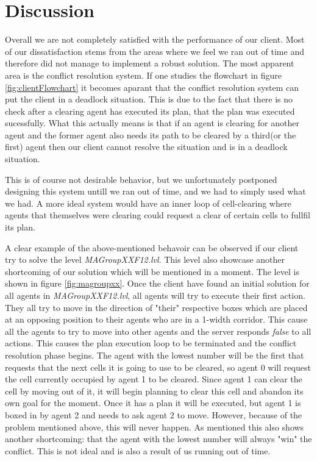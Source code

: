 \documentclass[letterpaper]{article}
\begin{document}
\section{Discussion}
Overall we are not completely satisfied with the performance of our client. Most of our dissatisfaction stems from the areas where we feel we ran out of time and therefore did not manage to implement a robust solution. The most apparent area is the conflict resolution system. If one studies the flowchart in figure \ref{fig:clientFlowchart} it becomes aparant that the conflict resolution system can put the client in a deadlock situation. This is due to the fact that there is no check after a clearing agent has executed its plan, that the plan was executed sucessfully. What this actually means is that if an agent is clearing for another agent and the former agent also needs its path to be cleared by a third(or the first) agent then our client cannot resolve the situation and is in a deadlock situation.

This is of course not desirable behavior, but we unfortunately postponed designing this system untill we ran out of time, and we had to simply used what we had. A more ideal system would have an inner loop of cell-clearing where agents that themselves were clearing could request a clear of certain cells to fullfil its plan.

A clear example of the above-mentioned behavoir can be observed if our client try to solve the level \textit{MAGroupXXF12.lvl}. This level also showcase another shortcoming of our solution which will be mentioned in a moment. The level is shown in figure \ref{fig:magroupxx}. Once the client have found an initial solution for all agents in \textit{MAGroupXXF12.lvl}, all agents will try to execute their first action. They all try to move in the direction of "their" respective boxes which are placed at an opposing position to their agents who are in a 1-width corridor. This cause all the agents to try to move into other agents and the server responds \textit{false} to all actions. This causes the plan execution loop to be terminated and the conflict resolution phase begins. The agent with the lowest number will be the first that requests that the next cells it is going to use to be cleared, so agent 0 will request the cell currently occupied by agent 1 to be cleared. Since agent 1 can clear the cell by moving out of it, it will begin planning to clear this cell and abandon its own goal for the moment. Once it has a plan it will be executed, but agent 1 is boxed in by agent 2 and needs to ask agent 2 to move. However, because of the problem mentioned above, this will never happen. As mentioned this also shows another shortcoming: that the agent with the lowest number will always "win" the conflict. This is not ideal and is also a result of us running out of time.
\end{document}
